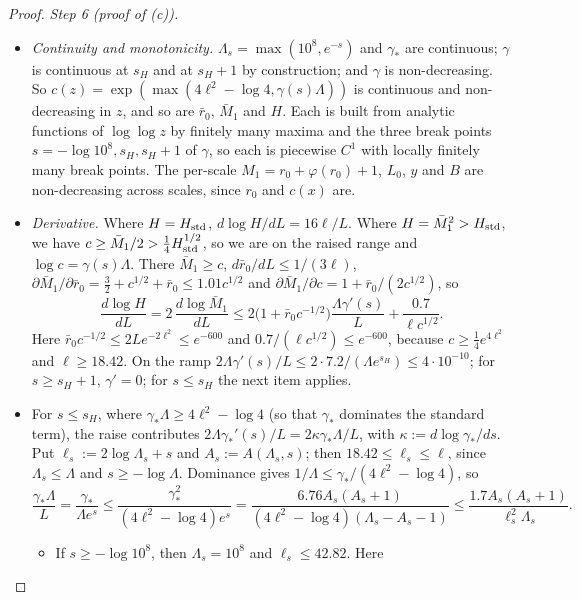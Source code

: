 \begin{proof}
\emph{Step 6 (proof of (c)).}
\begin{itemize}
\item \emph{Continuity and monotonicity.} $\Lambda_s=\max(10^8,e^{-s})$ and $\gamma_*$ are continuous; $\gamma$ is continuous
  at $s_H$ and at $s_H+1$ by construction; and $\gamma$ is non-decreasing. So $c(z)=\exp(\max(4\ell^2-\log4,\gamma(s)\Lambda))$
  is continuous and non-decreasing in $z$, and so are $\bar r_0$, $\bar M_1$ and $H$. Each is built from analytic functions of
  $\log\log z$ by finitely many maxima and the three break points $s=-\log10^8,s_H,s_H+1$ of $\gamma$, so each is piecewise
  $C^1$ with locally finitely many break points. The per-scale $M_1=r_0+\varphi(r_0)+1$, $L_0$, $y$ and $B$ are non-decreasing
  across scales, since $r_0$ and $c(x)$ are.
\item \emph{Derivative.} Where $H=H_{\mathrm{std}}$, $d\log H/dL=16\ell/L$. Where $H=\bar M_1^2>H_{\mathrm{std}}$, we have
  $c\ge\bar M_1/2>\tfrac14H_{\mathrm{std}}^{1/2}$, so we are on the raised range and $\log c=\gamma(s)\Lambda$. There $\bar M_1\ge c$,
  $d\bar r_0/dL\le1/(3\ell)$, $\partial\bar M_1/\partial\bar r_0=\tfrac32+c^{1/2}+\bar r_0\le1.01c^{1/2}$ and
  $\partial\bar M_1/\partial c=1+\bar r_0/(2c^{1/2})$, so
  \[
  \frac{d\log H}{dL}=2\,\frac{d\log\bar M_1}{dL}\le2\big(1+\bar r_0c^{-1/2}\big)\frac{\Lambda\gamma'(s)}L+\frac{0.7}{\ell c^{1/2}}.
  \]
  Here $\bar r_0c^{-1/2}\le2Le^{-2\ell^2}\le e^{-600}$ and $0.7/(\ell c^{1/2})\le e^{-600}$, because $c\ge\tfrac14e^{4\ell^2}$
  and $\ell\ge18.42$. On the ramp $2\Lambda\gamma'(s)/L\le2\cdot7.2/(\Lambda e^{s_H})\le4\cdot10^{-10}$; for $s\ge s_H+1$,
  $\gamma'=0$; for $s\le s_H$ the next item applies.
\item For $s\le s_H$, where $\gamma_*\Lambda\ge4\ell^2-\log4$ (so that $\gamma_*$ dominates the standard term), the raise
  contributes $2\Lambda\gamma_*'(s)/L=2\kappa\gamma_*\Lambda/L$, with $\kappa:=d\log\gamma_*/ds$. Put
  $\ell_s:=2\log\Lambda_s+s$ and $A_s:=A(\Lambda_s,s)$; then $18.42\le\ell_s\le\ell$, since $\Lambda_s\le\Lambda$ and
  $s\ge-\log\Lambda$. Dominance gives $1/\Lambda\le\gamma_*/(4\ell^2-\log4)$, so
  \[
  \frac{\gamma_*\Lambda}L=\frac{\gamma_*}{\Lambda e^s}\le\frac{\gamma_*^2}{(4\ell^2-\log4)e^s}
  =\frac{6.76A_s(A_s+1)}{(4\ell^2-\log4)(\Lambda_s-A_s-1)}\le\frac{1.7A_s(A_s+1)}{\ell_s^2\Lambda_s}.
  \]
  \begin{itemize}
  \item If $s\ge-\log10^8$, then $\Lambda_s=10^8$ and $\ell_s\le42.82$. Here

\end{itemize}
\end{itemize}
\end{proof}
